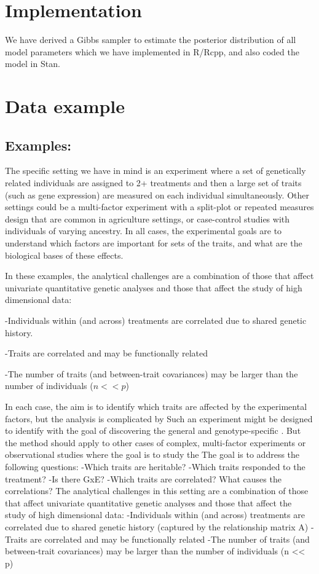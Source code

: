 \documentclass[11pt]{amsart}
\begin{document}
\section{Implementation}
We have derived a Gibbs sampler to estimate the posterior distribution of all model parameters which we have implemented in R/Rcpp, and also coded the model in Stan.

\section{Data example}

\subsection{Examples:}
	The specific setting we have in mind is an experiment where a set of genetically related individuals are assigned to 2+ treatments and then a large set of traits (such as gene expression) are measured on each individual simultaneously. 
	Other settings could be a multi-factor experiment with a split-plot or repeated measures design that are common in agriculture settings, or case-control studies with individuals of varying ancestry. 
	In all cases, the experimental goals are to understand which factors are important for sets of the traits, and what are the biological bases of these effects.
	
	In these examples, the analytical challenges are a combination of those that affect univariate quantitative genetic analyses and those that affect the study of high dimensional data:
	
-Individuals within (and across) treatments are correlated due to shared genetic history.

-Traits are correlated and may be functionally related

-The number of traits (and between-trait covariances) may be larger than the number of individuals ($n << p$)


	 In each case, the aim is to identify which traits are affected by the experimental factors, but the analysis is complicated by 
	Such an experiment might be designed to identify 
	 with the goal of discovering the general and genotype-specific 
	. But the method should apply to other cases of complex, multi-factor experiments or observational studies where the goal is to study the 
	The goal is to address the following questions:
-Which traits are heritable?
-Which traits responded to the treatment?
-Is there GxE?
-Which traits are correlated? What causes the correlations?
	The analytical challenges in this setting are a combination of those that affect univariate quantitative genetic analyses and those that affect the study of high dimensional data:
-Individuals within (and across) treatments are correlated due to shared genetic history (captured by the relationship matrix A)
-Traits are correlated and may be functionally related
-The number of traits (and between-trait covariances) may be larger than the number of individuals (n << p)
\end{document}

